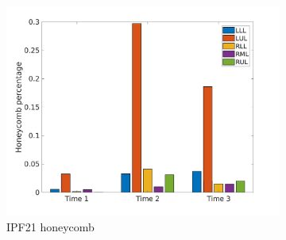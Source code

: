 \begin{figure}[H]
\begin{subfigure}{.46\linewidth}
  \includegraphics[width=\linewidth,trim={{.0\wd0} {.0\wd0} {.0\wd0} {.0\wd0}},clip]{Appendix/Image_AppexA/LobarDistribution/IPF21HoneycombLobarRegionDiseaseDistributionOverTime.jpg} %
  \caption{IPF21 honeycomb}
  \label{fig:IPF21LobarRegionDiseaseDistributionOverTime-c} 
\end{subfigure} 
\hspace{.3in}
\begin{subfigure}{.46\linewidth}%

\end{subfigure}
\end{figure}
